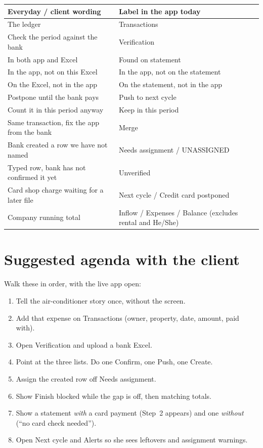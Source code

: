 \documentclass[11pt,a4paper]{article}
\begin{document}
\renewcommand{\arraystretch}{1.15}
\begin{tabularx}{\textwidth}{@{}>{\raggedright\arraybackslash}p{}>{\raggedright\arraybackslash}X@{}}
\toprule
\textbf{Everyday / client wording} & \textbf{Label in the app today} \\
\midrule
The ledger & Transactions \\
Check the period against the bank & Verification \\
In both app and Excel & Found on statement \\
In the app, not on this Excel & In the app, not on the statement \\
On the Excel, not in the app & On the statement, not in the app \\
Postpone until the bank pays & Push to next cycle \\
Count it in this period anyway & Keep in this period \\
Same transaction, fix the app from the bank & Merge \\
Bank created a row we have not named & Needs assignment / UNASSIGNED \\
Typed row, bank has not confirmed it yet & Unverified \\
Card shop charge waiting for a later file & Next cycle / Credit card postponed \\
Company running total & Inflow / Expenses / Balance (excludes rental and He/She) \\
\bottomrule
\end{tabularx}

\section{Suggested agenda with the client}

Walk these in order, with the live app open:

\begin{enumerate}
  \item Tell the air-conditioner story once, without the screen.
  \item Add that expense on Transactions (owner, property, date, amount,
        paid with).
  \item Open Verification and upload a bank Excel.
  \item Point at the three lists. Do one Confirm, one Push, one Create.
  \item Assign the created row off Needs assignment.
  \item Show Finish blocked while the gap is off, then matching totals.
  \item Show a statement \emph{with} a card payment (Step~2 appears) and
        one \emph{without} (``no card check needed'').
  \item Open Next cycle and Alerts so she sees leftovers and assignment
        warnings.
\end{enumerate}
\end{document}
